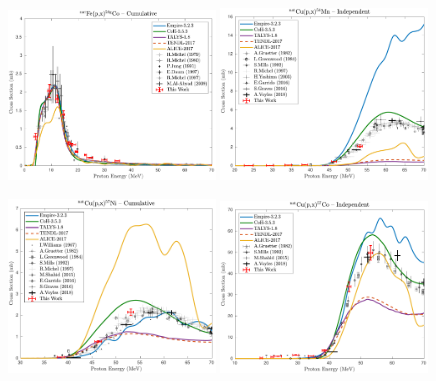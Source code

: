 \begin{figure}
 \centering
 
 \includegraphics[width=0.49\textwidth]{./figures/58Co.pdf}
 \includegraphics[width=0.49\textwidth]{./figures/54MnCu.pdf}
 
 \includegraphics[width=0.49\textwidth]{./figures/57Ni.pdf}
 \includegraphics[width=0.49\textwidth]{./figures/57Co_ind.pdf}
 

\end{figure}
